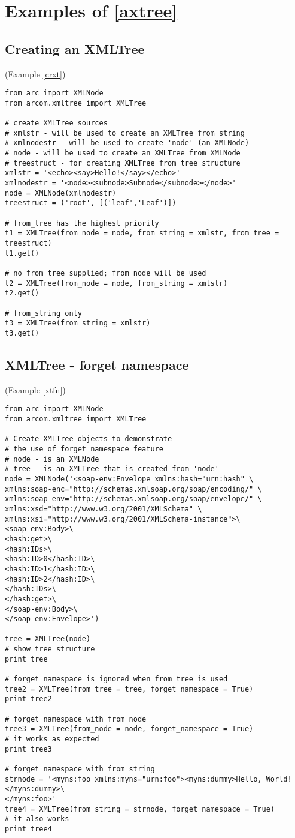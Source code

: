 \section{Examples of \ref{axtree}}
\subsection{Creating an XMLTree}
(Example \ref{crxt})
\label{ccrxt}
\begin{verbatim}
from arc import XMLNode
from arcom.xmltree import XMLTree

# create XMLTree sources
# xmlstr - will be used to create an XMLTree from string
# xmlnodestr - will be used to create 'node' (an XMLNode)
# node - will be used to create an XMLTree from XMLNode
# treestruct - for creating XMLTree from tree structure
xmlstr = '<echo><say>Hello!</say></echo>'
xmlnodestr = '<node><subnode>Subnode</subnode></node>'
node = XMLNode(xmlnodestr)
treestruct = ('root', [('leaf','Leaf')])

# from_tree has the highest priority
t1 = XMLTree(from_node = node, from_string = xmlstr, from_tree = treestruct) 
t1.get()

# no from_tree supplied; from_node will be used
t2 = XMLTree(from_node = node, from_string = xmlstr)
t2.get()

# from_string only
t3 = XMLTree(from_string = xmlstr)
t3.get()
\end{verbatim}

\subsection{XMLTree - forget namespace}
(Example \ref{xtfn})
\label{cxtfn}
\begin{verbatim}
from arc import XMLNode
from arcom.xmltree import XMLTree

# Create XMLTree objects to demonstrate
# the use of forget namespace feature
# node - is an XMLNode
# tree - is an XMLTree that is created from 'node'
node = XMLNode('<soap-env:Envelope xmlns:hash="urn:hash" \
xmlns:soap-enc="http://schemas.xmlsoap.org/soap/encoding/" \
xmlns:soap-env="http://schemas.xmlsoap.org/soap/envelope/" \
xmlns:xsd="http://www.w3.org/2001/XMLSchema" \
xmlns:xsi="http://www.w3.org/2001/XMLSchema-instance">\
<soap-env:Body>\
<hash:get>\
<hash:IDs>\
<hash:ID>0</hash:ID>\
<hash:ID>1</hash:ID>\
<hash:ID>2</hash:ID>\
</hash:IDs>\
</hash:get>\
</soap-env:Body>\
</soap-env:Envelope>')

tree = XMLTree(node)
# show tree structure
print tree

# forget_namespace is ignored when from_tree is used
tree2 = XMLTree(from_tree = tree, forget_namespace = True)
print tree2

# forget_namespace with from_node
tree3 = XMLTree(from_node = node, forget_namespace = True)
# it works as expected
print tree3

# forget_namespace with from_string
strnode = '<myns:foo xmlns:myns="urn:foo"><myns:dummy>Hello, World!</myns:dummy>\
</myns:foo>'
tree4 = XMLTree(from_string = strnode, forget_namespace = True)
# it also works
print tree4
\end{verbatim}

